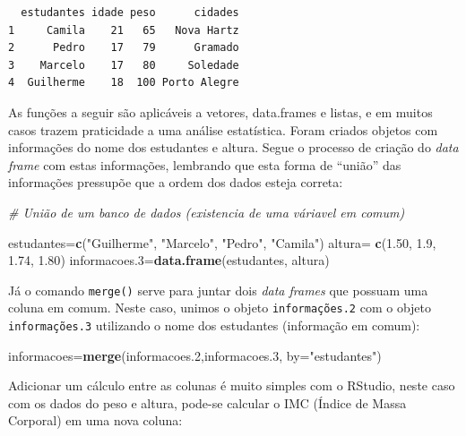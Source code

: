\documentclass[12pt,brazil,oneside]{book}
\newenvironment{Shaded}{\begin{snugshade}}{\end{snugshade}}
\newcommand{\CommentTok}[1]{\textcolor[rgb]{0.56,0.35,0.01}{\textit{#1}}}
\newcommand{\DataTypeTok}[1]{\textcolor[rgb]{0.13,0.29,0.53}{#1}}
\newcommand{\DecValTok}[1]{\textcolor[rgb]{0.00,0.00,0.81}{#1}}
\newcommand{\FloatTok}[1]{\textcolor[rgb]{0.00,0.00,0.81}{#1}}
\newcommand{\KeywordTok}[1]{\textcolor[rgb]{0.13,0.29,0.53}{\textbf{#1}}}
\newcommand{\NormalTok}[1]{#1}
\newcommand{\OperatorTok}[1]{\textcolor[rgb]{0.81,0.36,0.00}{\textbf{#1}}}
\newcommand{\StringTok}[1]{\textcolor[rgb]{0.31,0.60,0.02}{#1}}
\begin{document}
\begin{verbatim}
  estudantes idade peso      cidades
1     Camila    21   65   Nova Hartz
2      Pedro    17   79      Gramado
3    Marcelo    17   80     Soledade
4  Guilherme    18  100 Porto Alegre
\end{verbatim}

As funções a seguir são aplicáveis a vetores, data.frames e listas, e em
muitos casos trazem praticidade a uma análise estatística. Foram criados
objetos com informações do nome dos estudantes e altura. Segue o
processo de criação do \emph{data frame} com estas informações,
lembrando que esta forma de ``união'' das informações pressupõe que a
ordem dos dados esteja correta:

\begin{Shaded}
\begin{Highlighting}[]
\CommentTok{# União de um banco de dados (existencia de uma váriavel em comum)}

\NormalTok{estudantes=}\KeywordTok{c}\NormalTok{(}\StringTok{"Guilherme"}\NormalTok{, }\StringTok{"Marcelo"}\NormalTok{, }\StringTok{"Pedro"}\NormalTok{, }\StringTok{"Camila"}\NormalTok{)}
\NormalTok{altura=}\StringTok{ }\KeywordTok{c}\NormalTok{(}\FloatTok{1.50}\NormalTok{, }\FloatTok{1.9}\NormalTok{, }\FloatTok{1.74}\NormalTok{, }\FloatTok{1.80}\NormalTok{)}
\NormalTok{informacoes}\FloatTok{.3}\NormalTok{=}\KeywordTok{data.frame}\NormalTok{(estudantes, altura)}
\end{Highlighting}
\end{Shaded}

Já o comando \texttt{merge()} serve para juntar dois \emph{data frames}
que possuam uma coluna em comum. Neste caso, unimos o objeto
\texttt{informações.2} com o objeto \texttt{informações.3} utilizando o
nome dos estudantes (informação em comum):

\begin{Shaded}
\begin{Highlighting}[]
\NormalTok{informacoes=}\KeywordTok{merge}\NormalTok{(informacoes}\FloatTok{.2}\NormalTok{,informacoes}\FloatTok{.3}\NormalTok{, }\DataTypeTok{by=}\StringTok{"estudantes"}\NormalTok{)}
\end{Highlighting}
\end{Shaded}

Adicionar um cálculo entre as colunas é muito simples com o RStudio,
neste caso com os dados do peso e altura, pode-se calcular o IMC (Índice
de Massa Corporal) em uma nova coluna:

\begin{Shaded}
\end{Shaded}
\end{document}
